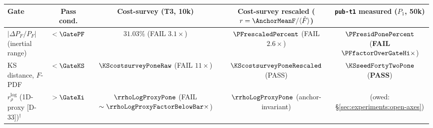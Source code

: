 \begin{table}[t]
    \centering
    \renewcommand{\arraystretch}{1.15}
    \setlength{\tabcolsep}{3pt}
    \footnotesize
    \begin{tabular}{l|c|c|c|c}
    Gate & Pass cond. & Cost-survey (T3, 10k) & Cost-survey rescaled ($r=\AnchorMeanF/\langle\hat F\rangle$) & \texttt{pub-t1} measured ($P_1$, 50k) \\
    \hline
    $|\Delta P_F/P_F|$ (inertial range) & $< \GatePF$ & $31.03\%$ (FAIL $3.1\times$) & $\PFrescaledPercent$ (FAIL $2.6\times$) & $\mathbf{\PFresidPonePercent}$ (\textbf{FAIL} $\mathbf{\PFfactorOverGateHi\times}$) \\
    KS distance, $F$-PDF & $< \GateKS$ & $\KScostsurveyPoneRaw$ (FAIL $11\times$) & $\mathbf{\KScostsurveyPoneRescaled}$ (PASS) & $\mathbf{\KSseedFortyTwoPone}$ (\textbf{PASS}) \\
    $r_\rho^{\log}$ (1D-proxy [D-33])$^\dagger$ & $> \GateXi$ & $\rrhoLogProxyPone$ (FAIL $\sim \rrhoLogProxyFactorBelowBar\times$) & $\rrhoLogProxyPone$ (anchor-invariant) & (owed: \S\ref{sec:experiments:open-axes}) \\
    \end{tabular}

\end{table}
